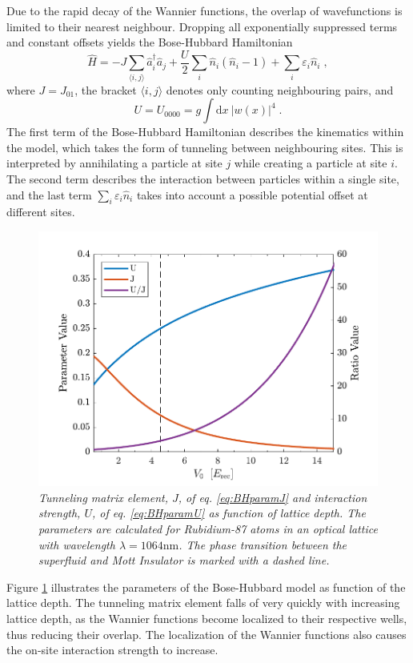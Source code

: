 Due to the rapid decay of the Wannier functions, the overlap of wavefunctions is limited to their nearest neighbour. Dropping all exponentially suppressed terms and constant offsets yields the Bose-Hubbard Hamiltonian
\begin{equation}
	\hat{H} = - J \sum_{\langle i,j \rangle} \hat{a}_{i}^{\dag} \hat{a}_{j} + \frac{U}{2} \sum_{i} \hat{n}_i \left( \hat{n}_i -1 \right) + \sum_{i} \varepsilon_i \hat{n}_i \; ,
	\label{BHhamil}
\end{equation}
where $J = J_{0 1}$, the bracket $\langle i,j \rangle$ denotes only counting neighbouring pairs, and
\begin{equation}
	U = U_{0 0 0 0} = g \int \mathrm{d}x \ |w(x)|^4 \; .
	\label{eq:BHparamU}
\end{equation}
The first term of the Bose-Hubbard Hamiltonian describes the kinematics within the model, which takes the form of tunneling between neighbouring sites. This is interpreted by annihilating a particle at site $j$ while creating a particle at site $i$. The second term describes the interaction between particles within a single site, and the last term $\sum_{i} \varepsilon_i \hat{n}_i$ takes into account a possible potential offset at different sites.
\begin{figure}[!h]
	\centering
	\includegraphics[width=0.7\columnwidth]{Figures/UJparameters.pdf} 
	\caption{\textit{Tunneling matrix element, $J$, of eq. \eqref{eq:BHparamJ} and interaction strength, $U$, of eq. \eqref{eq:BHparamU} as function of lattice depth. The parameters are calculated for Rubidium-87 atoms in an optical lattice with wavelength $\lambda = 1064 \mathrm{nm}$. The phase transition between the superfluid and Mott Insulator is marked with a dashed line.}}
	\label{fig:UJparameters} 
\end{figure}
Figure \ref{fig:UJparameters} illustrates the parameters of the Bose-Hubbard model as function of the lattice depth. The tunneling matrix element falls of very quickly with increasing lattice depth, as the Wannier functions become localized to their respective wells, thus reducing their overlap. The localization of the Wannier functions also causes the on-site interaction strength to increase.

